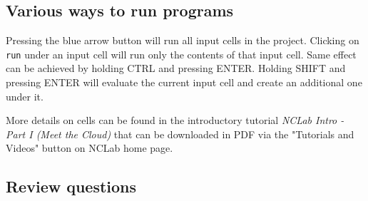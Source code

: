 \documentclass[article,A4,12pt]{llncs}
\begin{document}
\subsection{Various ways to run programs}

Pressing the blue arrow button will run all input cells in the project. Clicking 
on {\tt run} under an input cell will run only the contents of that input cell. 
Same effect can be achieved by holding CTRL and pressing ENTER. Holding SHIFT
and pressing ENTER will evaluate the current input cell and create an additional one
under it.

More details on cells can be found in the introductory tutorial {\em NCLab Intro - 
Part I (Meet the Cloud)} that 
can be downloaded in PDF via the "Tutorials and Videos" button on NCLab home page.

\subsection{Review questions}
\end{document}
